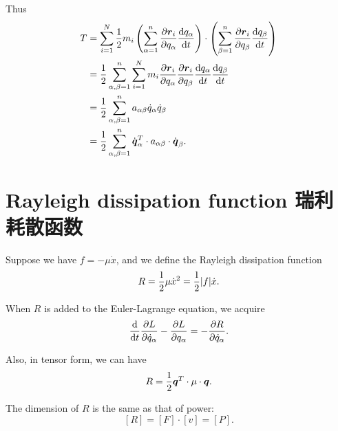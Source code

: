 Thus \begin{align*}
    T & = \sum_{i = 1}^{N} {1 \over 2} m_i \left( \sum_{\alpha = 1}^{n} {\partial \boldsymbol{r}_i \over \partial q_\alpha} {\mathrm{d} q_\alpha \over \mathrm{d}t} \right) \cdot \left( \sum_{\beta = 1}^{n} {\partial \boldsymbol{r}_i \over \partial q_\beta} {\mathrm{d} q_\beta \over \mathrm{d}t} \right) \\
    & = {1 \over 2} \sum_{\alpha, \beta = 1}^{n} \sum_{i = 1}^{N} m_i {\partial \boldsymbol{r}_i \over \partial q_\alpha} {\partial \boldsymbol{r}_i \over \partial q_\beta} {\mathrm{d} q_\alpha \over \mathrm{d}t} {\mathrm{d} q_\beta \over \mathrm{d}t} \\
    & = {1 \over 2} \sum_{\alpha, \beta = 1}^{n} a_{\alpha\beta} \dot{q}_\alpha \dot{q}_\beta \\
    & = {1 \over 2} \sum_{\alpha, \beta = 1}^{n} \dot{\boldsymbol{q}}_\alpha^{T} \cdot a_{\alpha \beta} \cdot \dot{\boldsymbol{q}}_\beta.
\end{align*}

\section{Rayleigh dissipation function
瑞利耗散函数}\label{rayleigh-dissipation-function-ux745eux5229ux8017ux6563ux51fdux6570}

Suppose we have \(f = - \mu \dot{x}\), and we define the Rayleigh
dissipation function
\[R = {1 \over 2} \mu \dot{x}^2 = {1 \over 2} |f| \dot{x}.\]

When \(R\) is added to the Euler-Lagrange equation, we acquire
\[{\mathrm{d} \over \mathrm{d}t} {\partial L \over \partial \dot q_\alpha} - {\partial L \over \partial q_\alpha} = - {\partial R \over \partial \dot q_\alpha}.\]

Also, in tensor form, we can have
\[R = {1 \over 2} \boldsymbol{q}^T \cdot \mathbf{\mu} \cdot \boldsymbol{q}.\]

The dimension of \(R\) is the same as that of power:
\[[R] = [F] \cdot [v] = [P].\]
